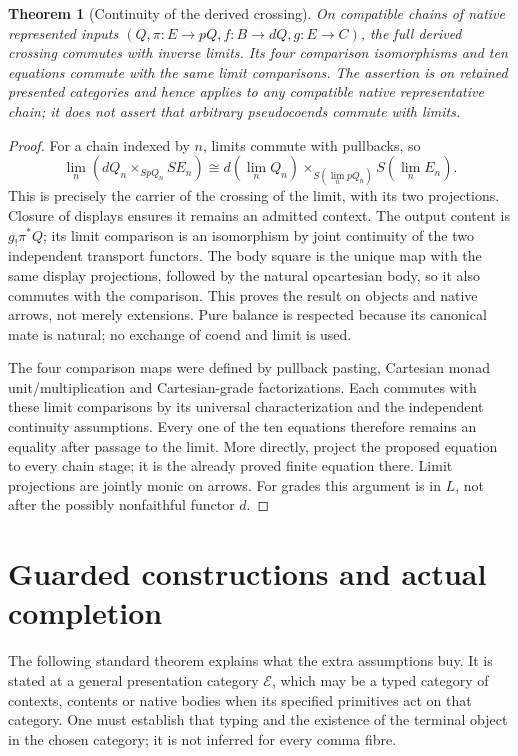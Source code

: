 \documentclass[11pt]{article}
\newtheorem{theorem}{Theorem}\newtheorem{proposition}{Proposition}
\begin{document}
\begin{theorem}[Continuity of the derived crossing]
On compatible chains of native represented inputs $(Q,\pi:E\to pQ,f:B\to dQ,g:E\to C)$, the full derived crossing commutes with inverse limits. Its four comparison isomorphisms and ten equations commute with the same limit comparisons. The assertion is on retained presented categories and hence applies to any compatible native representative chain; it does not assert that arbitrary pseudocoends commute with limits.
\end{theorem}
\begin{proof}
For a chain indexed by $n$, limits commute with pullbacks, so
\[
 \lim_n(dQ_n\times_{S pQ_n}SE_n)
 \cong d(\lim_nQ_n)\times_{S(\lim_npQ_n)}S(\lim_nE_n).
\]
This is precisely the carrier of the crossing of the limit, with its two projections. Closure of displays ensures it remains an admitted context. The output content is $g_!\pi^*Q$; its limit comparison is an isomorphism by joint continuity of the two independent transport functors. The body square is the unique map with the same display projections, followed by the natural opcartesian body, so it also commutes with the comparison. This proves the result on objects and native arrows, not merely extensions. Pure balance is respected because its canonical mate is natural; no exchange of coend and limit is used.

The four comparison maps were defined by pullback pasting, Cartesian monad unit/multiplication and Cartesian-grade factorizations. Each commutes with these limit comparisons by its universal characterization and the independent continuity assumptions. Every one of the ten equations therefore remains an equality after passage to the limit. More directly, project the proposed equation to every chain stage; it is the already proved finite equation there. Limit projections are jointly monic on arrows. For grades this argument is in $L$, not after the possibly nonfaithful functor $d$.
\end{proof}

\section{Guarded constructions and actual completion}
The following standard theorem explains what the extra assumptions buy. It is stated at a general presentation category $\mathcal E$, which may be a typed category of contexts, contents or native bodies when its specified primitives act on that category. One must establish that typing and the existence of the terminal object in the chosen category; it is not inferred for every comma fibre.
\end{document}

